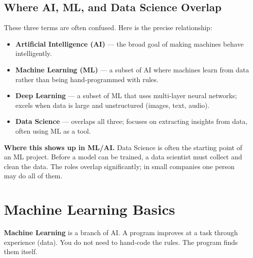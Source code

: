 \documentclass[a4paper,11pt]{article}
\newcommand{\vocab}[1]{\textbf{\color{navy}#1}}
\begin{document}
\subsection{Where AI, ML, and Data Science Overlap}

These three terms are often confused. Here is the precise relationship:

\begin{center}
\end{center}

\begin{itemize}
  \item \vocab{Artificial Intelligence (AI)} — the broad goal of making machines behave intelligently.
  \item \vocab{Machine Learning (ML)} — a subset of AI where machines learn from data rather than being hand-programmed with rules.
  \item \vocab{Deep Learning} — a subset of ML that uses multi-layer neural networks; excels when data is large and unstructured (images, text, audio).
  \item \vocab{Data Science} — overlaps all three; focuses on extracting insights from data, often using ML as a tool.
\end{itemize}

\noindent\textbf{Where this shows up in ML/AI.} Data Science is often the starting point of an ML project. Before a model can be trained, a data scientist must collect and clean the data. The roles overlap significantly; in small companies one person may do all of them.

\section{Machine Learning Basics}

\vocab{Machine Learning} is a branch of AI. A program improves at a task through experience (data). You do not need to hand-code the rules. The program finds them itself.
\end{document}
